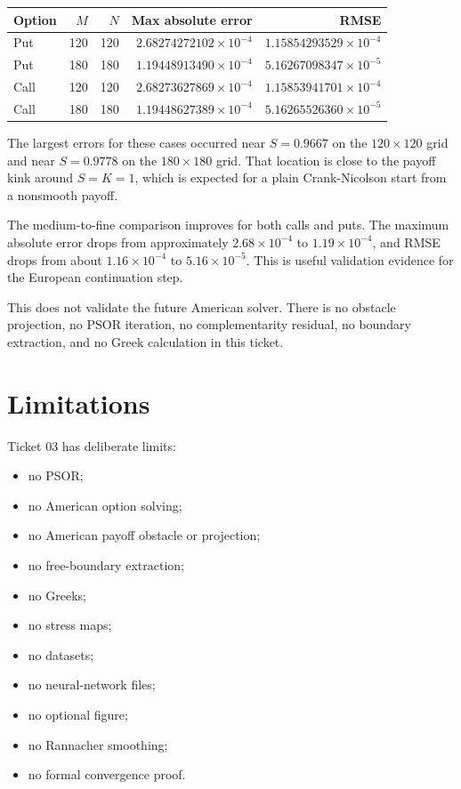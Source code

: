 \documentclass[11pt,a4paper]{article}
\begin{document}
\begin{longtable}{L{0.13\textwidth}r r r r}
\toprule
Option & \(M\) & \(N\) & Max absolute error & RMSE \\
\midrule
\endhead
Put & 120 & 120 & \(2.68274272102\times10^{-4}\) & \(1.15854293529\times10^{-4}\) \\
Put & 180 & 180 & \(1.19448913490\times10^{-4}\) & \(5.16267098347\times10^{-5}\) \\
Call & 120 & 120 & \(2.68273627869\times10^{-4}\) & \(1.15853941701\times10^{-4}\) \\
Call & 180 & 180 & \(1.19448627389\times10^{-4}\) & \(5.16265526360\times10^{-5}\) \\
\bottomrule
\end{longtable}

The largest errors for these cases occurred near \(S=0.9667\) on the \(120\times120\) grid and
near \(S=0.9778\) on the \(180\times180\) grid. That location is close to the payoff kink around
\(S=K=1\), which is expected for a plain Crank-Nicolson start from a nonsmooth payoff.

The medium-to-fine comparison improves for both calls and puts. The maximum absolute error drops
from approximately \(2.68\times10^{-4}\) to \(1.19\times10^{-4}\), and RMSE drops from about
\(1.16\times10^{-4}\) to \(5.16\times10^{-5}\). This is useful validation evidence for the
European continuation step.

This does not validate the future American solver. There is no obstacle projection, no PSOR
iteration, no complementarity residual, no boundary extraction, and no Greek calculation in this
ticket.

\section{Limitations}

Ticket 03 has deliberate limits:
\begin{itemize}
  \item no PSOR;
  \item no American option solving;
  \item no American payoff obstacle or projection;
  \item no free-boundary extraction;
  \item no Greeks;
  \item no stress maps;
  \item no datasets;
  \item no neural-network files;
  \item no optional figure;
  \item no Rannacher smoothing;
  \item no formal convergence proof.
\end{itemize}
\end{document}
